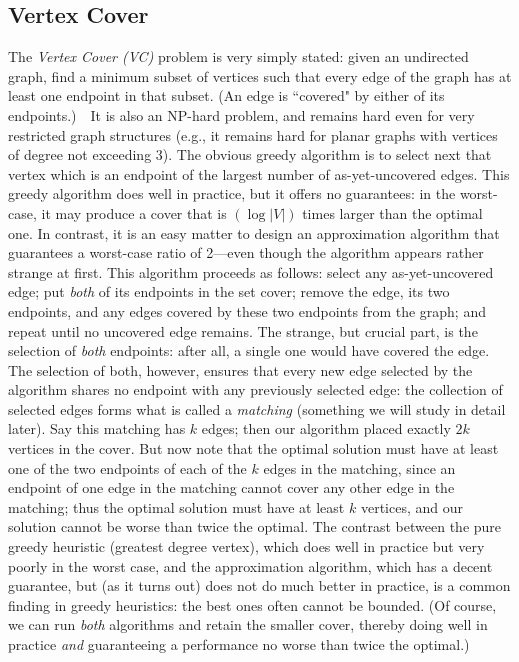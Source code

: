 \documentclass[11pt]{article}
\begin{document}
\subsection{Vertex Cover}
The \emph{Vertex Cover (VC)} problem is very simply stated: given an undirected
graph, find a minimum subset of vertices such that every edge of the graph
has at least one endpoint in that subset.  (An edge is ``covered" by either of
its endpoints.)\ \ It is also an NP-hard problem,
and remains hard even for very restricted graph structures (e.g., it remains
hard for planar graphs with vertices of degree not exceeding 3).  The
obvious greedy algorithm is to select next that vertex which is an endpoint
of the largest number of as-yet-uncovered edges.  This greedy algorithm does
well in practice, but it offers no guarantees: in the worst-case, it may
produce a cover that is $(\log |V|)$ times larger than the optimal one.
In contrast, it is an easy matter to design an approximation algorithm
that guarantees a worst-case ratio of 2---even though the algorithm appears
rather strange at first.  This algorithm proceeds as follows: select any
as-yet-uncovered edge; put \emph{both} of its endpoints in the set cover;
remove the edge, its two endpoints, and any edges covered by these two
endpoints from the graph; and repeat until no uncovered edge remains.
The strange, but crucial part, is the selection of \emph{both} endpoints:
after all, a single one would have covered the edge.  The selection of both,
however, ensures that every new edge selected by the algorithm shares no
endpoint with any previously selected edge: the collection of selected
edges forms what is called a \emph{matching} (something we will study in detail
later).  Say this matching has $k$ edges; then our algorithm placed exactly
$2k$ vertices in the cover.  But now note that the optimal solution
must have at least one of the two endpoints of each of the $k$ edges
in the matching, since an endpoint of one edge in the matching cannot cover
any other edge in the matching; thus the optimal solution must have at least
$k$ vertices, and our solution cannot be worse than twice the optimal.
The contrast between the pure greedy heuristic (greatest degree vertex),
which does well in practice but very poorly in the worst case, and the
approximation algorithm, which has a decent guarantee, but (as it turns out)
does not do much better in practice, is a common finding in greedy heuristics:
the best ones often cannot be bounded.  (Of course, we can run \emph{both}
algorithms and retain the smaller cover, thereby doing well in practice
\emph{and} guaranteeing a performance no worse than twice the optimal.)
\end{document}
